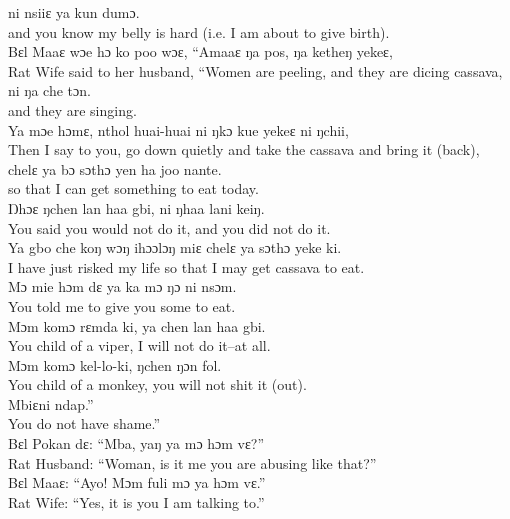  ni nsiiɛ ya kun dumɔ.\\
 and you know my belly is hard (i.e. I am about to give birth).\\

Bɛl Maaɛ wɔe hɔ ko poo wɔɛ, “Amaaɛ ŋa pos, ŋa ketheŋ yekeɛ,\\
Rat Wife said to her husband, “Women are peeling, and they are dicing cassava,\\

ni ŋa che tɔn.\\
and they are singing.\\

Ya mɔe hɔmɛ, nthol huai-huai ni ŋkɔ kue yekeɛ ni ŋchii,\\
Then I say to you, go down quietly and take the cassava and bring it (back),\\

chelɛ ya bɔ sɔthɔ yen ha joo nante.\\
so that I can get something to eat today.\\

Ŋhɔɛ ŋchen lan haa gbi, ni ŋhaa lani keiŋ.\\
You said you would not do it, and you did not do it.\\

Ya gbo che koŋ wɔŋ ihɔɔlɔŋ miɛ chelɛ ya sɔthɔ yeke ki.\\
I have just risked my life so that I may get cassava to eat.\\

Mɔ mie hɔm dɛ ya ka mɔ ŋɔ ni nsɔm.\\
You told me to give you some to eat.\\

Mɔm komɔ rɛmda ki, ya chen lan haa gbi.\\
You child of a viper, I will not do it--at all.\\

Mɔm komɔ kel-lo-ki, ŋchen ŋɔn fol.\\
You child of a monkey, you will not shit it (out).\\

Mbiɛni ndap.”\\
You do not have shame.”\\

Bɛl Pokan dɛ: “Mba, yaŋ ya mɔ hɔm vɛ?”\\
Rat Husband: “Woman, is it me you are abusing like that?”\\

Bɛl Maaɛ: “Ayo! Mɔm fuli mɔ ya hɔm vɛ.”\\
Rat Wife: “Yes, it is you I am talking to.”\\

